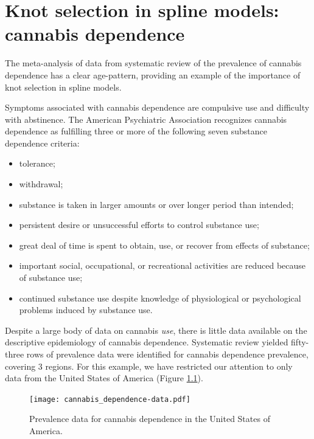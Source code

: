 \chapter{Knot selection in spline models: cannabis dependence}
\label{applications-splines_knot_loc}

The meta-analysis of data from systematic review of the prevalence of
cannabis dependence has a clear age-pattern, providing an example of
the importance of knot selection in spline models.

Symptoms associated with cannabis dependence are compulsive use and
difficulty with abstinence.  The American Psychiatric Association
recognizes cannabis dependence as fulfilling three or more of the
following seven substance dependence criteria: \cite{american_diagnostic_2000, coffey_cannabis_2002}
    \begin{itemize} \label{page:app-substance_dependence}
        \item tolerance;
        \item withdrawal;
        \item substance is taken in larger amounts or over longer
          period than intended;
        \item persistent desire or unsuccessful efforts to control
          substance use;
        \item great deal of time is spent to obtain, use, or recover
          from effects of substance;
        \item important social, occupational, or recreational
          activities are reduced because of substance use;
        \item continued substance use despite knowledge of
          physiological or psychological problems induced by substance
          use.
    \end{itemize}

Despite a large body of data on cannabis \emph{use}, there is little
data available on the descriptive epidemiology of cannabis
dependence.\cite{Degenhardt_GBDrugs_2011} Systematic review yielded
fifty-three rows of prevalence data were identified for cannabis
dependence prevalence, covering 3 regions.  For this example, we have
restricted our attention to only data from the United States of America (Figure
\ref{fig:app-cannabis_data}).

    \begin{figure}[h]
        \begin{center}
            \texttt{[image: cannabis\_dependence-data.pdf]}
            \caption{Prevalence data for cannabis dependence in the United States of America.}
            \label{fig:app-cannabis_data}
        \end{center}
    \end{figure}

